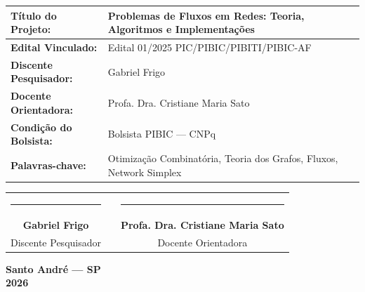 \documentclass[12pt,a4paper]{article}
\begin{document}
\begin{center}
\small
{}
\begin{tabular}{|p{}|>{\raggedright\arraybackslash}p{}|}
\hline
\textbf{Título do Projeto:} & Problemas de Fluxos em Redes: Teoria, Algoritmos e Implementações \\ \hline
\textbf{Edital Vinculado:} & Edital 01/2025 PIC/PIBIC/PIBITI/PIBIC-AF \\ \hline
\textbf{Discente Pesquisador:} & Gabriel Frigo \\ \hline
\textbf{Docente Orientadora:} & Profa. Dra. Cristiane Maria Sato \\ \hline
\textbf{Condição do Bolsista:} & Bolsista PIBIC --- CNPq \\ \hline
\textbf{Palavras-chave:} & Otimização Combinatória, Teoria dos Grafos, Fluxos, Network Simplex \\ \hline
\end{tabular}
\end{center}

\vfill

\begin{center}
\small
\begin{tabular}{cp{1.5cm}c}
\rule{6.5cm}{0.4pt} & & \rule{6.5cm}{0.4pt}\\
\textbf{Gabriel Frigo} & & \textbf{Profa. Dra. Cristiane Maria Sato}\\
Discente Pesquisador & & Docente Orientadora
\end{tabular}
\end{center}

\vspace{0.6cm}

\begin{center}
    \textbf{Santo André --- SP}\\
    \textbf{2026}
\end{center}

\newpage

\pagestyle{empty}
\renewcommand{\contentsname}{Sumário}
\setcounter{tocdepth}{1}
\tableofcontents

\clearpage

\pagestyle{textual}
\end{document}
